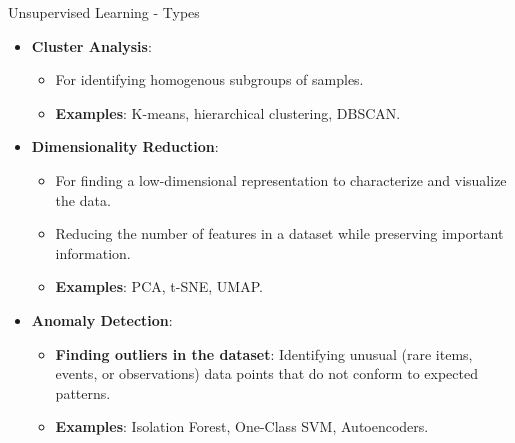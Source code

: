 \begin{frame}[allowframebreaks]{Unsupervised Learning - Types}
    \begin{itemize}
        \item \textbf{Cluster Analysis}: 
        \begin{itemize}
            \item For identifying homogenous subgroups of samples.
            \item \textbf{Examples}: K-means, hierarchical clustering, DBSCAN.
        \end{itemize}    
        \item \textbf{Dimensionality Reduction}:
        \begin{itemize}
            \item For finding a low-dimensional representation to characterize and visualize the data.
            \item Reducing the number of features in a dataset while preserving important information.
            \item \textbf{Examples}: PCA, t-SNE, UMAP.
        \end{itemize}
        \item \textbf{Anomaly Detection}: 
        \begin{itemize}
            \item \textbf{Finding outliers in the dataset}: Identifying unusual (rare items, events, or observations) data points that do not conform to expected patterns.
            \item \textbf{Examples}: Isolation Forest, One-Class SVM, Autoencoders.
        \end{itemize}
    \end{itemize}
\end{frame}

